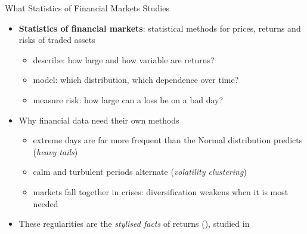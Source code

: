 \begin{frame}{What Statistics of Financial Markets Studies}
\itemsize{\small}
\begin{itemize}
    \item \textbf{Statistics of financial markets}: statistical methods for prices, returns and risks of traded assets
    \begin{itemize}
        \item describe: how large and how variable are returns?
        \item model: which distribution, which dependence over time?
        \item measure risk: how large can a loss be on a bad day?
    \end{itemize}
    \item Why financial data need their own methods
    \begin{itemize}
        \item extreme days are far more frequent than the Normal distribution predicts (\emph{heavy tails})
        \item calm and turbulent periods alternate (\emph{volatility clustering})
        \item markets fall together in crises: diversification weakens when it is most needed
    \end{itemize}
    \item These regularities are the \emph{stylised facts} of returns (), studied in 
\end{itemize}
\end{frame}

